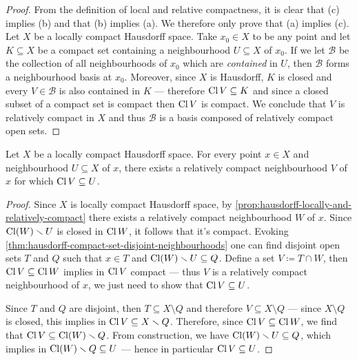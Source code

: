 \begin{proof}
From the definition of local and relative compactness, it is clear that (c)
implies (b) and that (b) implies (a). We therefore only prove that (a) implies
(c). Let \(X\) be a locally compact Hausdorff space. Take \(x_0 \in X\) to be
any point and let \(K \subseteq X\) be a compact set containing a neighbourhood
\(U \subseteq X\) of \(x_0\). If we let \(\mathcal{B}\) be the collection of all
neighbourhoods of \(x_0\) which are \emph{contained} in \(U\), then
\(\mathcal{B}\) forms a neighbourhood basis at \(x_0\). Moreover, since \(X\) is
Hausdorff, \(K\) is closed and every \(V \in \mathcal{B}\) is also contained in
\(K\) --- therefore \(\operatorname{Cl} V \subseteq K\) and since a closed subset of a compact
set is compact then \(\operatorname{Cl} V\) is compact. We conclude that \(V\) is relatively
compact in \(X\) and thus \(\mathcal{B}\) is a basis composed of relatively
compact open sets.
\end{proof}


\begin{lemma}
\label{lem:loc-cpct-haus-rel-cpct-nbhd}
Let \(X\) be a locally compact Hausdorff space. For every point \(x \in X\) and
neighbourhood \(U \subseteq X\) of \(x\), there exists a relatively compact
neighbourhood \(V\) of \(x\) for which \(\operatorname{Cl} V \subseteq U\).
\end{lemma}

\begin{proof}
Since \(X\) is locally compact Hausdorff space, by
\cref{prop:hausdorff-locally-and-relatively-compact} there exists a relatively
compact neighbourhood \(W\) of \(x\). Since \(\operatorname{Cl}(W) \smallsetminus U\) is closed in
\(\operatorname{Cl} W\), it follows that it's compact. Evoking
\cref{thm:hausdorff-compact-set-disjoint-neighbourhoods} one can find disjoint
open sets \(T\) and \(Q\) such that \(x \in T\) and
\(\operatorname{Cl}(W) \smallsetminus U \subseteq Q\). Define a set \(V \coloneq T \cap W\), then
\(\operatorname{Cl} V \subseteq \operatorname{Cl} W\) implies in \(\operatorname{Cl} V\) compact --- thus \(V\) is a
relatively compact neighbourhood of \(x\), we just need to show that
\(\operatorname{Cl} V \subseteq U\).

Since \(T\) and \(Q\) are disjoint, then \(T \subseteq X \setminus Q\) and
therefore \(V \subseteq X \setminus Q\) --- since \(X \setminus Q\) is closed,
this implies in \(\operatorname{Cl} V \subseteq X \smallsetminus Q\). Therefore, since
\(\operatorname{Cl} V \subseteq \operatorname{Cl} W\), we find that \(\operatorname{Cl} V \subseteq \operatorname{Cl}(W) \smallsetminus
Q\). From construction, we have \(\operatorname{Cl}(W) \smallsetminus U \subseteq Q\), which
implies in \(\operatorname{Cl}(W) \smallsetminus Q \subseteq U\) --- hence in particular
\(\operatorname{Cl} V \subseteq U\).
\end{proof}

